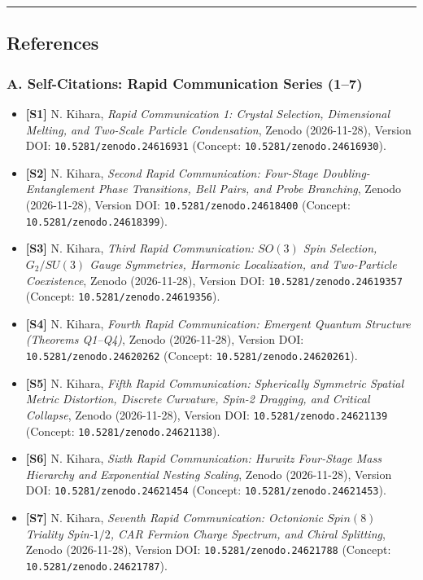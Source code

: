 \documentclass[
  a4paper,
]{article}
\providecommand{\tightlist}{%
  \setlength{\itemsep}{0pt}\setlength{\parskip}{0pt}}
\begin{document}
\begin{center}\rule{0.5\linewidth}{0.5pt}\end{center}

\subsection{References}\label{references}

\subsubsection{A. Self-Citations: Rapid Communication Series
(1--7)}\label{a.-self-citations-rapid-communication-series-17}

\begin{itemize}
\tightlist
\item
  \textbf{{[}S1{]}} N. Kihara, \emph{Rapid Communication 1: Crystal
  Selection, Dimensional Melting, and Two-Scale Particle Condensation},
  Zenodo (2026-11-28), Version DOI: \texttt{10.5281/zenodo.24616931}
  (Concept: \texttt{10.5281/zenodo.24616930}).
\item
  \textbf{{[}S2{]}} N. Kihara, \emph{Second Rapid Communication:
  Four-Stage Doubling-Entanglement Phase Transitions, Bell Pairs, and
  Probe Branching}, Zenodo (2026-11-28), Version DOI:
  \texttt{10.5281/zenodo.24618400} (Concept:
  \texttt{10.5281/zenodo.24618399}).
\item
  \textbf{{[}S3{]}} N. Kihara, \emph{Third Rapid Communication:
  \(SO(3)\) Spin Selection, \(G_2/SU(3)\) Gauge Symmetries, Harmonic
  Localization, and Two-Particle Coexistence}, Zenodo (2026-11-28),
  Version DOI: \texttt{10.5281/zenodo.24619357} (Concept:
  \texttt{10.5281/zenodo.24619356}).
\item
  \textbf{{[}S4{]}} N. Kihara, \emph{Fourth Rapid Communication:
  Emergent Quantum Structure (Theorems Q1--Q4)}, Zenodo (2026-11-28),
  Version DOI: \texttt{10.5281/zenodo.24620262} (Concept:
  \texttt{10.5281/zenodo.24620261}).
\item
  \textbf{{[}S5{]}} N. Kihara, \emph{Fifth Rapid Communication:
  Spherically Symmetric Spatial Metric Distortion, Discrete Curvature,
  Spin-2 Dragging, and Critical Collapse}, Zenodo (2026-11-28), Version
  DOI: \texttt{10.5281/zenodo.24621139} (Concept:
  \texttt{10.5281/zenodo.24621138}).
\item
  \textbf{{[}S6{]}} N. Kihara, \emph{Sixth Rapid Communication: Hurwitz
  Four-Stage Mass Hierarchy and Exponential Nesting Scaling}, Zenodo
  (2026-11-28), Version DOI: \texttt{10.5281/zenodo.24621454} (Concept:
  \texttt{10.5281/zenodo.24621453}).
\item
  \textbf{{[}S7{]}} N. Kihara, \emph{Seventh Rapid Communication:
  Octonionic \(Spin(8)\) Triality Spin-\(1/2\), CAR Fermion Charge
  Spectrum, and Chiral Splitting}, Zenodo (2026-11-28), Version DOI:
  \texttt{10.5281/zenodo.24621788} (Concept:
  \texttt{10.5281/zenodo.24621787}).
\end{itemize}
\end{document}
